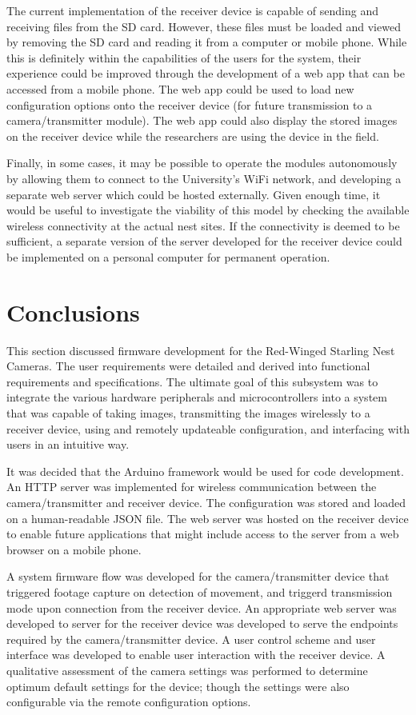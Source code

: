 \documentclass[class=report,11pt,crop=false]{standalone}
\begin{document}
The current implementation of the receiver device is capable of sending and receiving files from the SD card. However, these files must be loaded and viewed by removing the SD card and reading it from a computer or mobile phone. While this is definitely within the capabilities of the users for the system, their experience could be improved through the development of a web app that can be accessed from a mobile phone. The web app could be used to load new configuration options onto the receiver device (for future transmission to a camera/transmitter module). The web app could also display the stored images on the receiver device while the researchers are using the device in the field.

Finally, in some cases, it may be possible to operate the modules autonomously by allowing them to connect to the University's WiFi network, and developing a separate web server which could be hosted externally. Given enough time, it would be useful to investigate the viability of this model by checking the available wireless connectivity at the actual nest sites. If the connectivity is deemed to be sufficient, a separate version of the server developed for the receiver device could be implemented on a personal computer for permanent operation.

\section{Conclusions}

This section discussed firmware development for the Red-Winged Starling Nest Cameras. The user requirements were detailed and derived into functional requirements and specifications. The ultimate goal of this subsystem was to integrate the various hardware peripherals and microcontrollers into a system that was capable of taking images, transmitting the images wirelessly to a receiver device, using and remotely updateable configuration, and interfacing with users in an intuitive way. 

It was decided that the Arduino framework would be used for code development. An HTTP server was implemented for wireless communication between the camera/transmitter and receiver device. The configuration was stored and loaded on a human-readable JSON file. The web server was hosted on the receiver device to enable future applications that might include access to the server from a web browser on a mobile phone.

A system firmware flow was developed for the camera/transmitter device that triggered footage capture on detection of movement, and triggerd transmission mode upon connection from the receiver device. An appropriate web server was developed to server for the receiver device was developed to serve the endpoints required by the camera/transmitter device. A user control scheme and user interface was developed to enable user interaction with the receiver device. A qualitative assessment of the camera settings was performed to determine optimum default settings for the device; though the settings were also configurable via the remote configuration options.
\end{document}
